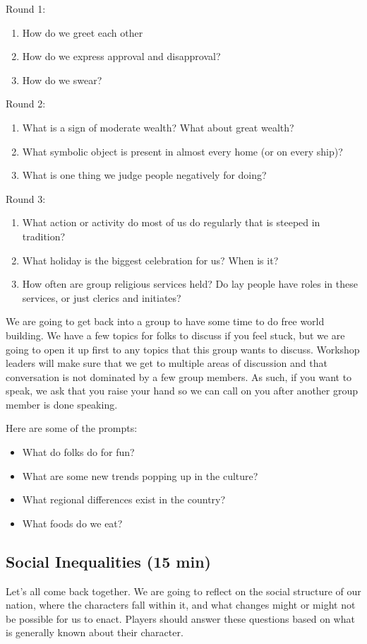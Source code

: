 \documentclass[green]{GL2020}
\begin{document}
Round 1:
\begin{enumerate}
	\item How do we greet each other
	\item How do we express approval and disapproval?
	\item How do we swear?
\end{enumerate}

Round 2:
\begin{enumerate}
	\item What is a sign of moderate wealth? What about great wealth?
	\item What symbolic object is present in almost every home (or on every ship)?
	\item What is one thing we judge people negatively for doing?
\end{enumerate}

Round 3:
\begin{enumerate}
	\item What action or activity do most of us do regularly that is steeped in tradition?
	\item What holiday is the biggest celebration for us? When is it?
	\item How often are group religious services held? Do lay people have roles in these services, or just clerics and initiates?
\end{enumerate}

We are going to get back into a group to have some time to do free world building.  We have a few topics for folks to discuss if you feel stuck, but we are going to open it up first to any topics that this group wants to discuss.  Workshop leaders will make sure that we get to multiple areas of discussion and that conversation is not dominated by a few group members.  As such, if you want to speak, we ask that you raise your hand so we can call on you after another group member is done speaking.

Here are some of the prompts:
\begin{itemize}
	\item What do folks do for fun?
	\item What are some new trends popping up in the culture?
	\item What regional differences exist in the country?
	\item What foods do we eat?
\end{itemize}  

\subsection*{Social Inequalities (15 min)}
Let’s all come back together. We are going to reflect on the social structure of our nation, where the characters fall within it, and what changes might or might not be possible for us to enact. Players should answer these questions based on what is generally known about their character.
\end{document}
